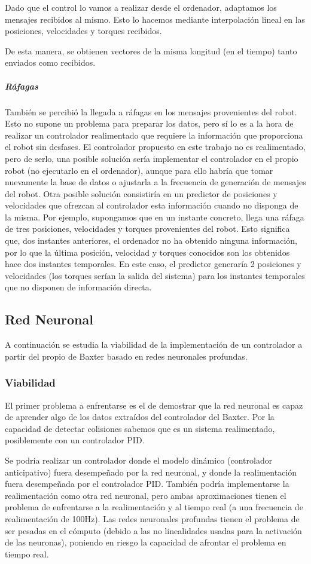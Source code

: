 Dado que el control lo vamos a realizar desde el ordenador, adaptamos los mensajes recibidos al mismo. Esto lo hacemos mediante interpolación lineal en las posiciones, velocidades y torques recibidos.

De esta manera, se obtienen vectores de la misma longitud (en el tiempo) tanto enviados como recibidos.

\subparagraph{Ráfagas}
También se percibió la llegada a ráfagas en los mensajes provenientes del robot. Esto no supone un problema para preparar los datos, pero sí lo es a la hora de realizar un controlador realimentado que requiere la información que proporciona el robot sin desfases. El controlador propuesto en este trabajo no es realimentado, pero de serlo, una posible solución sería implementar el controlador en el propio robot (no ejecutarlo en el ordenador), aunque para ello habría que tomar nuevamente la base de datos o ajustarla a la frecuencia de generación de mensajes del robot. Otra posible solución consistiría en un predictor de posiciones y velocidades que ofrezcan al controlador esta información cuando no disponga de la misma. Por ejemplo, supongamos que en un instante concreto, llega una ráfaga de tres posiciones, velocidades y torques provenientes del robot. Esto significa que, dos instantes anteriores, el ordenador no ha obtenido ninguna información, por lo que la última posición, velocidad y torques conocidos son los obtenidos hace dos instantes temporales. En este caso, el predictor generaría 2 posiciones y velocidades (los torques serían la salida del sistema) para los instantes temporales que no disponen de información directa.


\subsection{Red Neuronal}
A continuación se estudia la viabilidad de la implementación de un controlador a partir del propio de Baxter basado en redes neuronales profundas.
\subsubsection{Viabilidad}
El primer problema a enfrentarse es el de demostrar que la red neuronal es capaz de aprender algo de los datos extraídos del controlador del Baxter. Por la capacidad de detectar colisiones sabemos que es un sistema realimentado, posiblemente con un controlador PID.

Se podría realizar un controlador donde el modelo dinámico (controlador anticipativo) fuera desempeñado por la red neuronal, y donde la realimentación fuera desempeñada por el controlador PID. También podría implementarse la realimentación como otra red neuronal, pero ambas aproximaciones tienen el problema de enfrentarse a la realimentación y al tiempo real (a una frecuencia de realimentación de 100Hz). Las redes neuronales profundas tienen el problema de ser pesadas en el cómputo (debido a las no linealidades usadas para la activación de las neuronas), poniendo en riesgo la capacidad de afrontar el problema en tiempo real.

